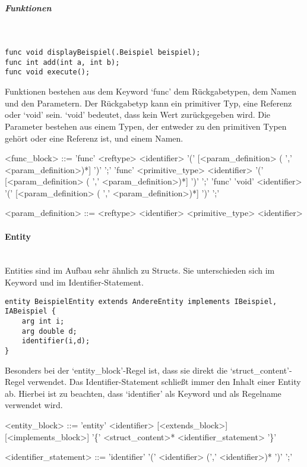 \documentclass[./einleitung.tex]{subfiles}
\begin{document}
\subparagraph{Funktionen}\mbox{}\\
\begin{lstlisting}
func void displayBeispiel(.Beispiel beispiel);
func int add(int a, int b);
func void execute();
\end{lstlisting}
Funktionen bestehen aus dem Keyword `func' dem Rückgabetypen, dem Namen und den Parametern.
Der Rückgabetyp kann ein primitiver Typ, eine Referenz oder `void' sein.
`void' bedeutet, dass kein Wert zurückgegeben wird.
Die Parameter bestehen aus einem Typen, der entweder zu den primitiven Typen gehört oder eine Referenz ist, und einem Namen.
\begin{grammar}
<func_block> ::= 'func' <reftype> <identifier> '(' [<param_definition> ( ',' <param_definition>)*] ')' ';'
\alt 'func' <primitive_type> <identifier> '(' [<param_definition> ( ',' <param_definition>)*] ')' ';'
\alt 'func' 'void' <identifier> '(' [<param_definition> ( ',' <param_definition>)*] ')' ';'

<param_definition> ::= <reftype> <identifier>
\alt <primitive_type> <identifier>
\end{grammar}

\paragraph{Entity}\mbox{}\\
Entities sind im Aufbau sehr ähnlich zu Structs.
Sie unterschieden sich im Keyword und im Identifier-Statement.
\begin{lstlisting}
entity BeispielEntity extends AndereEntity implements IBeispiel, IABeispiel {
    arg int i;
    arg double d;
    identifier(i,d);
}
\end{lstlisting}
Besonders bei der `entity\_block'-Regel ist, dass sie direkt die `struct_content'-Regel verwendet.
Das Identifier-Statement schließt immer den Inhalt einer Entity ab.
Hierbei ist zu beachten, dass `identifier' als Keyword und als Regelname verwendet wird.
\begin{grammar}
<entity_block> ::= 'entity' <identifier> [<extends_block>] [<implements_block>] '\{' <struct_content>* <identifier_statement> '\}' 

<identifier_statement> ::= 'identifier' '(' <identifier> (',' <identifier>)* ')' ';'
\end{grammar}
\end{document}

